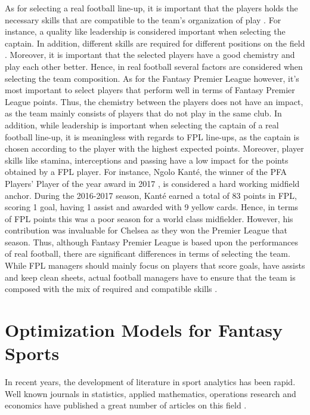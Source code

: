 As for selecting a real football line-up, it is important that the players holds the necessary skills that are compatible to the team's organization of play \citep{Pantuso}. For instance, a quality like leadership is considered important when selecting the captain. In addition, different skills are required for different positions on the field \citep{Boon}. Moreover, it is important that the selected players have a good chemistry and play each other better. Hence, in real football several factors are considered when selecting the team composition. As for the Fantasy Premier League however, it's most important to select players that perform well in terms of Fantasy Premier League points. Thus, the chemistry between the players does not have an impact, as the team mainly consists of players that do not play in the same club. In addition, while leadership is important when selecting the captain of a real football line-up, it is meaningless with regards to FPL line-ups, as the captain is chosen according to the player with the highest expected points. Moreover, player skills like stamina, interceptions and passing have a low impact for the points obtained by a FPL player. For instance, Ngolo Kant\'e, the winner of the PFA Players' Player of the year award in 2017 \citep{Skysports_Kante}, is considered a hard working midfield anchor. During the 2016-2017 season, Kant\'e earned a total of 83 points in FPL, scoring 1 goal, having 1 assist and awarded with 9 yellow cards. Hence, in terms of FPL points this was a poor season for a world class midfielder. However, his contribution was invaluable for Chelsea as they won the Premier League that season. Thus, although Fantasy Premier League is based upon the performances of real football, there are significant differences in terms of selecting the team. While FPL managers should mainly focus on players that score goals, have assists and keep clean sheets, actual football managers have to ensure that the team is composed with the mix of required and compatible skills \citep{Pantuso}.



\section{Optimization Models for Fantasy Sports} \label{Opt_Models_for_Fantasy_Sports}


In recent years, the development of literature in sport analytics has been rapid. Well known journals in statistics, applied mathematics, operations research and economics have published a great number of articles on this field \citep{Coleman}.


